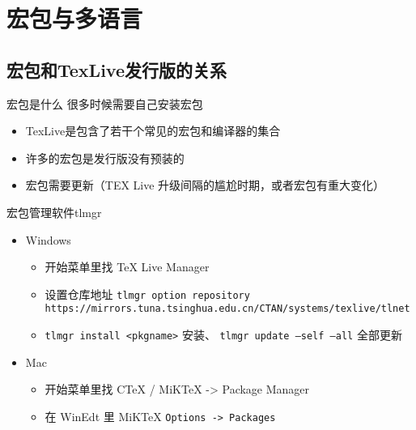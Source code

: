 \section{宏包与多语言}
\subsection{宏包和TexLive发行版的关系}
\begin{frame}{宏包是什么}
    很多时候需要自己安装宏包
    \begin{itemize}
        \item TexLive是包含了若干个常见的宏包和编译器的集合
        \item 许多的宏包是发行版没有预装的
        \item 宏包需要更新（TEX Live 升级间隔的尴尬时期，或者宏包有重大变化）
    \end{itemize}
    宏包管理软件tlmgr
    \begin{itemize}
        \item<+-> Windows
            \begin{itemize}
              \item 开始菜单里找 TeX Live Manager
              \item 设置仓库地址 \texttt{tlmgr option repository https://mirrors.tuna.tsinghua.edu.cn/CTAN/systems/texlive/tlnet}
              \item \texttt{tlmgr install <pkgname>} 安装、 \texttt{tlmgr update --self --all} 全部更新
            \end{itemize}
        \item<+-> Mac
          \begin{itemize}
              \item 开始菜单里找 CTeX / MiKTeX -> Package Manager
              \item 在 WinEdt 里 MiKTeX \texttt{Options -> Packages}
        \end{itemize}
        
    \end{itemize}

    

    \vspace{0.4cm} %
\end{frame}

